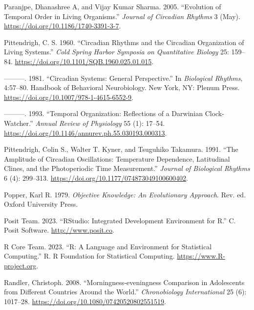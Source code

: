 \documentclass[
  12pt,
  a4paper,
  oneside]{tesesusp}
\newlength{\cslhangindent}
\newlength{\cslentryspacingunit} %
\newenvironment{CSLReferences}[2] %
 {%
  \setlength{\parindent}{0pt}
  \ifodd #1
  \let\oldpar\par
  \def\par{\hangindent=\cslhangindent\oldpar}
  \fi
  \setlength{\parskip}{#2\cslentryspacingunit}
 }%
 {}
\begin{document}
\begin{CSLReferences}{1}{0}
\leavevmode{}%
Paranjpe, Dhanashree A, and Vijay Kumar Sharma. 2005. {``Evolution of
Temporal Order in Living Organisms.''} \emph{Journal of Circadian
Rhythms} 3 (May). \url{https://doi.org/10.1186/1740-3391-3-7}.

\leavevmode{}%
Pittendrigh, C. S. 1960. {``Circadian Rhythms and the Circadian
Organization of Living Systems.''} \emph{Cold Spring Harbor Symposia on
Quantitative Biology} 25: 159--84.
\url{https://doi.org/10.1101/SQB.1960.025.01.015}.

\leavevmode{}%
---------. 1981. {``Circadian Systems: General Perspective.''} In
\emph{Biological Rhythms}, 4:57--80. Handbook of Behavioral
Neurobiology. New York, NY: Plenum Press.
\url{https://doi.org/10.1007/978-1-4615-6552-9}.

\leavevmode{}%
---------. 1993. {``Temporal Organization: Reflections of a Darwinian
Clock-Watcher.''} \emph{Annual Review of Physiology} 55 (1): 17--54.
\url{https://doi.org/10.1146/annurev.ph.55.030193.000313}.

\leavevmode{}%
Pittendrigh, Colin S., Walter T. Kyner, and Tsuguhiko Takamura. 1991.
{``The Amplitude of Circadian Oscillations: Temperature Dependence,
Latitudinal Clines, and the Photoperiodic Time Measurement.''}
\emph{Journal of Biological Rhythms} 6 (4): 299--313.
\url{https://doi.org/10.1177/074873049100600402}.

\leavevmode{}%
Popper, Karl R. 1979. \emph{Objective Knowledge: An Evolutionary
Approach}. Rev. ed. Oxford University Press.

\leavevmode{}%
Posit Team. 2023. {``RStudio: Integrated Development Environment for
R.''} C. Posit Software. \url{http://www.posit.co}.

\leavevmode{}%
R Core Team. 2023. {``R: A Language and Environment for Statistical
Computing.''} R. R Foundation for Statistical Computing.
\url{https://www.R-project.org}.

\leavevmode{}%
Randler, Christoph. 2008. {``Morningness‐eveningness Comparison in
Adolescents from Different Countries Around the World.''}
\emph{Chronobiology International} 25 (6): 1017--28.
\url{https://doi.org/10.1080/07420520802551519}.


\end{CSLReferences}
\end{document}
